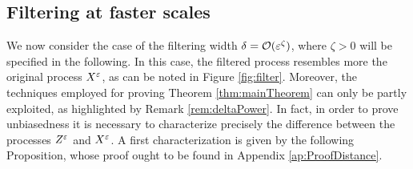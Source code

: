 \documentclass[10pt]{article}
\begin{document}

\subsection{Filtering at faster scales}\label{sec:Fast}


We now consider the case of the filtering width $\delta = \mathcal O(\varepsilon^\zeta)$, where $\zeta > 0$ will be specified in the following. In this case, the filtered process resembles more the original process $X^\varepsilon$, as can be noted in Figure \ref{fig:filter}. Moreover, the techniques employed for proving Theorem \ref{thm:mainTheorem} can only be partly exploited, as highlighted by Remark \ref{rem:deltaPower}. In fact, in order to prove unbiasedness it is necessary to characterize precisely the difference between the processes $Z^\varepsilon$ and $X^\varepsilon$. A first characterization is given by the following Proposition, whose proof ought to be found in Appendix \ref{ap:ProofDistance}.
\end{document}
